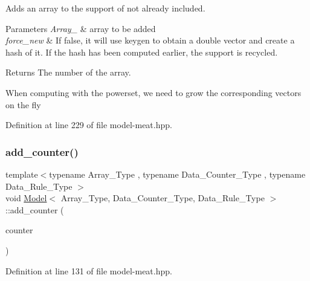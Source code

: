 Adds an array to the support of not already included. 


\begin{DoxyParams}{Parameters}
{\em Array\+\_\+} & array to be added \\
\hline
{\em force\+\_\+new} & If {\ttfamily false}, it will use {\ttfamily keygen} to obtain a double vector and create a hash of it. If the hash has been computed earlier, the support is recycled.\\
\hline
\end{DoxyParams}
\begin{DoxyReturn}{Returns}
The number of the array. 
\end{DoxyReturn}
When computing with the powerset, we need to grow the corresponding vectors on the fly 

Definition at line 229 of file model-\/meat.\+hpp.

\mbox{\label{class_model_a1548bd4681944c3eb761a22a38ef5547}} 
\subsubsection{\texorpdfstring{add\+\_\+counter()}{add\_counter()}\hspace{0.1cm}{\footnotesize\ttfamily [1/3]}}
{\footnotesize\ttfamily template$<$typename Array\+\_\+\+Type , typename Data\+\_\+\+Counter\+\_\+\+Type , typename Data\+\_\+\+Rule\+\_\+\+Type $>$ \\
void \hyperlink{class_model}{Model}$<$ Array\+\_\+\+Type, Data\+\_\+\+Counter\+\_\+\+Type, Data\+\_\+\+Rule\+\_\+\+Type $>$\+::add\+\_\+counter (\begin{DoxyParamCaption}\item[{\hyperlink{class_counter}{Counter}$<$ Array\+\_\+\+Type, Data\+\_\+\+Counter\+\_\+\+Type $>$ \&}]{counter }\end{DoxyParamCaption})\hspace{0.3cm}{\ttfamily [inline]}}



Definition at line 131 of file model-\/meat.\+hpp.

\mbox{\label{class_model_a6c1f524daf08e10888a49318030616c4}} 
